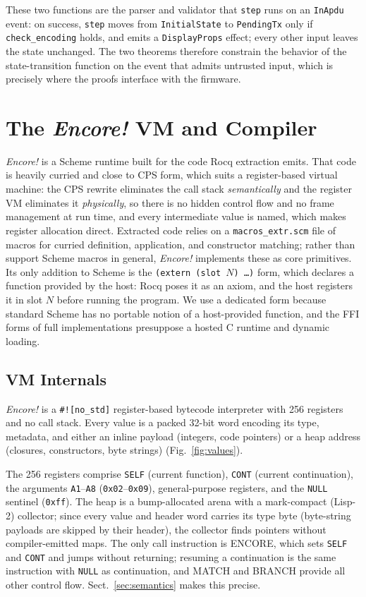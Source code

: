 \documentclass[runningheads]{llncs}
\newcommand{\encore}{\textit{Encore!}}
\newcommand{\code}[1]{\texttt{#1}}
\begin{document}
These two functions are the parser and validator that \code{step} runs on an \code{InApdu} event: on success, \code{step} moves from \code{InitialState} to \code{PendingTx} only if \code{check\_encoding} holds, and emits a \code{DisplayProps} effect; every other input leaves the state unchanged.
The two theorems therefore constrain the behavior of the state-transition function on the event that admits untrusted input, which is precisely where the proofs interface with the firmware.

\section{The \encore{} VM and Compiler}

\encore{} is a Scheme runtime built for the code Rocq extraction emits.
That code is heavily curried and close to CPS form, which suits a register-based virtual machine: the CPS rewrite eliminates the call stack \emph{semantically} and the register VM eliminates it \emph{physically}, so there is no hidden control flow and no frame management at run time, and every intermediate value is named, which makes register allocation direct.
Extracted code relies on a \code{macros\_extr.scm} file of macros for curried definition, application, and constructor matching; rather than support Scheme macros in general, \encore{} implements these as core primitives.
Its only addition to Scheme is the \code{(extern (slot $N$) \dots)} form, which declares a function provided by the host: Rocq poses it as an axiom, and the host registers it in slot $N$ before running the program.
We use a dedicated form because standard Scheme has no portable notion of a host-provided function, and the FFI forms of full implementations presuppose a hosted C runtime and dynamic loading.

\subsection{VM Internals}

\encore{} is a \code{\#![no\_std]} register-based bytecode interpreter with 256 registers and no call stack.
Every value is a packed 32-bit word encoding its type, metadata, and either an inline payload (integers, code pointers) or a heap address (closures, constructors, byte strings) (Fig.~\ref{fig:values}).



The 256 registers comprise \code{SELF} (current function), \code{CONT} (current continuation), the arguments \code{A1}--\code{A8} (\code{0x02}--\code{0x09}), general-purpose registers, and the \code{NULL} sentinel (\code{0xff}).
The heap is a bump-allocated arena with a mark-compact (Lisp-2) collector; since every value and header word carries its type byte (byte-string payloads are skipped by their header), the collector finds pointers without compiler-emitted maps.
The only call instruction is ENCORE, which sets \code{SELF} and \code{CONT} and jumps without returning; resuming a continuation is the same instruction with \code{NULL} as continuation, and MATCH and BRANCH provide all other control flow.
Sect.~\ref{sec:semantics} makes this precise.
\end{document}
